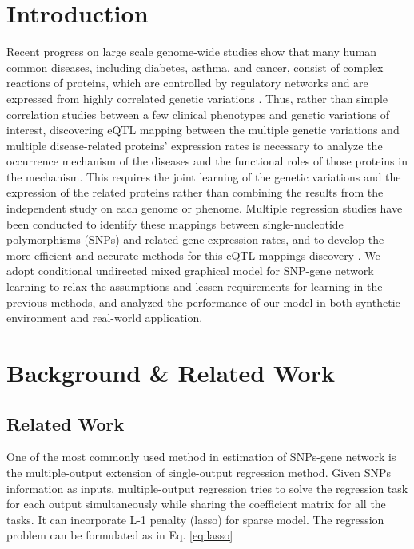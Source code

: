 \documentclass{article}
\begin{document}
\section{Introduction}
Recent progress on large scale genome-wide studies show that many human common diseases, including diabetes, asthma, and cancer, consist of complex reactions of proteins, which are controlled by regulatory networks and are expressed from highly correlated genetic variations \cite{basso2005reverse, chen2008variations}. Thus, rather than simple correlation studies between a few clinical phenotypes and genetic variations of interest, discovering eQTL mapping between the multiple genetic variations and multiple disease-related proteins' expression rates is necessary to analyze the occurrence mechanism of the diseases and the functional roles of those proteins in the mechanism. This requires the joint learning of the genetic variations and the expression of the related proteins rather than combining the results from the independent study on each genome or phenome. Multiple regression studies have been conducted to identify these mappings between single-nucleotide polymorphisms (SNPs) and related gene expression rates, and to develop the more efficient and accurate methods for this eQTL mappings discovery \cite{kim2010tree, sohn2012joint}. We adopt conditional undirected mixed graphical model \cite{lee2013structure} for SNP-gene network learning to relax the assumptions and lessen requirements for learning in the previous methods, and analyzed the performance of our model in both synthetic environment and real-world application.




\section{Background \& Related Work}
\label{LiteratureReview}


\subsection{Related Work}
One of the most commonly used method in estimation of SNPs-gene network is the multiple-output extension of single-output regression method. Given SNPs information as inputs, multiple-output regression tries to solve the regression task for each output simultaneously while sharing the coefficient matrix for all the tasks. It can incorporate L-1 penalty (lasso) \cite{tibshirani1996regression} for sparse model. The regression problem can be formulated as in Eq. \ref{eq:lasso}
\end{document}
